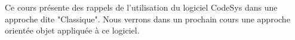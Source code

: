 Ce cours présente des rappels de l'utilisation du logiciel CodeSys dans une approche dite "Classique". Nous verrons dans un prochain cours une approche orientée objet appliquée à ce logiciel. 
